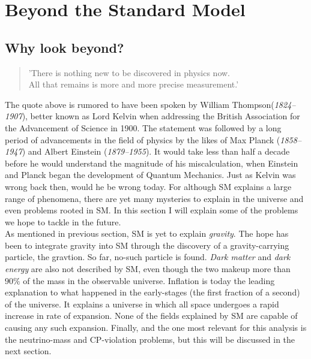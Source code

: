 \section{Beyond the Standard Model}
\subsection{Why look beyond?}
\begin{center}
    \hyphenblockcquote{UKenglish}{Kelvin}{
        'There is nothing new to be discovered in physics now.\\
        All that remains is more and more precise measurement.'
        }
\end{center}
The quote above is rumored to have been spoken by William Thompson(\emph{1824–1907}), better
known as Lord Kelvin when addressing the British Association for the Advancement
of Science in 1900. The statement was followed by a long period of advancements in the
field of physics by the likes of Max Planck (\emph{1858–1947}) and 
Albert Einstein (\emph{1879–1955}). It would take less than half a decade
before he would understand the magnitude of his miscalculation, when Einstein and 
Planck began the development of Quantum Mechanics. Just as Kelvin was wrong back then, 
would he be wrong today. For although \ac{SM} explains a large range of phenomena,
there are yet many mysteries to explain in the universe and even problems rooted in \ac{SM}.
In this section I will explain some of the problems we hope to tackle in the future. 
\\ \newline
As mentioned in previous section, \ac{SM} is yet to explain \emph{gravity}. The hope has been
to integrate gravity into \ac{SM} through the discovery of a gravity-carrying particle, 
the gravtion. So far, no-such particle is found. \emph{Dark matter} and \emph{dark energy} are 
also not described by \ac{SM}, even though the two makeup more than $90\%$ of the mass in the 
observable universe. Inflation is today the leading explanation to what happened in the early-stages
(the first fraction of a second) of the universe. It explains a universe in which all space
undergoes a rapid increase in rate of expansion. None of the fields explained by \ac{SM} are 
capable of causing any such expansion. Finally, and the one most relevant for this analysis is the
neutrino-mass and \ac{CP}-violation problems, but this will be discussed in the next section.
